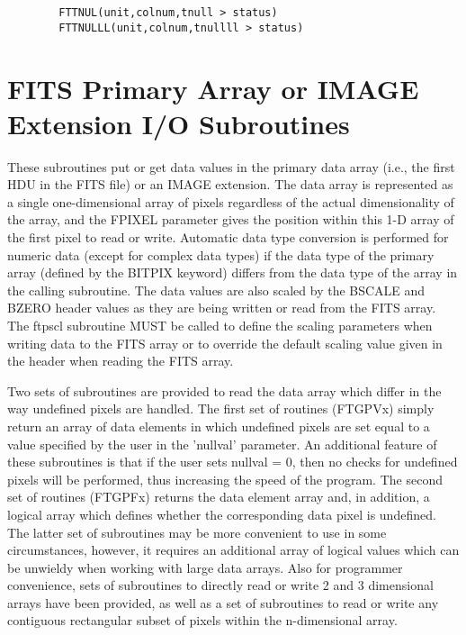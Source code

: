 \documentclass[11pt]{book}
\begin{document}
\begin{verbatim}
        FTTNUL(unit,colnum,tnull > status)
        FTTNULLL(unit,colnum,tnullll > status)
\end{verbatim}


\section{FITS Primary Array or IMAGE Extension I/O Subroutines \label{FTPPR}}

    These subroutines put or get data values in the primary data array
(i.e., the first HDU in the FITS file) or an IMAGE extension.  The
data array is represented as a single one-dimensional array of
pixels regardless of the actual dimensionality of the array, and the
FPIXEL parameter gives the position within this 1-D array of the first
pixel to read  or write.  Automatic data type conversion is performed
for numeric data (except for complex data types) if the data type of
the primary array (defined by the BITPIX keyword) differs from the data
type of the array in the calling subroutine.  The data values are also
scaled by the BSCALE and BZERO header values as they are being written
or read from the FITS array.  The ftpscl subroutine MUST be
called to define the scaling parameters when writing data to the FITS
array or to override the default scaling value given in the header when
reading the FITS array.

    Two sets of subroutines are provided to read the data array which
differ in the way undefined pixels are handled.  The first set of
routines (FTGPVx) simply return an array of data elements in which
undefined pixels are set equal to a value specified by the user in the
'nullval' parameter.  An additional feature of these subroutines is
that if the user sets nullval = 0, then no checks for undefined pixels
will be performed, thus increasing the speed of the program.  The
second set of routines (FTGPFx) returns the data element array and, in
addition, a logical array which defines whether the corresponding data
pixel is undefined.  The latter set of subroutines may be more
convenient to use in some circumstances, however, it requires an
additional array of logical values which can be unwieldy when working
with large data arrays.  Also for programmer convenience, sets of
subroutines to directly read or write 2 and 3 dimensional arrays  have
been provided, as well as a set of subroutines to read or write any
contiguous rectangular subset of pixels within the n-dimensional array.
\end{document}

